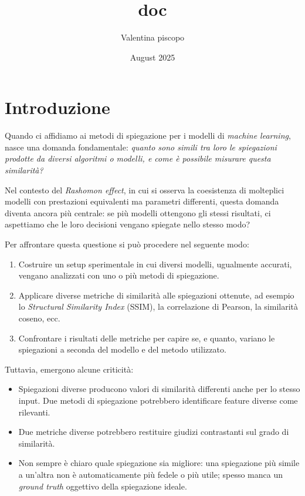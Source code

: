 \documentclass{article}
\title{doc}
\author{Valentina piscopo}
\date{August 2025}
\begin{document}
\maketitle

\tableofcontents
\newpage

\section{Introduzione}

Quando ci affidiamo ai metodi di spiegazione per i modelli di \emph{machine
      learning}, nasce una domanda fondamentale: \textit{quanto sono simili tra loro
      le spiegazioni prodotte da diversi algoritmi o modelli, e come è possibile
      misurare questa similarità?}

Nel contesto del \emph{Rashomon effect}, in cui si osserva la coesistenza di
molteplici modelli con prestazioni equivalenti ma parametri differenti, questa
domanda diventa ancora più centrale: se più modelli ottengono gli stessi
risultati, ci aspettiamo che le loro decisioni vengano spiegate nello stesso
modo?

Per affrontare questa questione si può procedere nel seguente modo:
\begin{enumerate}
      \item Costruire un setup sperimentale in cui diversi modelli, ugualmente accurati,
            vengano analizzati con uno o più metodi di spiegazione.
      \item Applicare diverse metriche di similarità alle spiegazioni ottenute, ad esempio
            lo \emph{Structural Similarity Index} (SSIM), la correlazione di Pearson, la
            similarità coseno, ecc.
      \item Confrontare i risultati delle metriche per capire se, e quanto, variano le
            spiegazioni a seconda del modello e del metodo utilizzato.
\end{enumerate}

Tuttavia, emergono alcune criticità:
\begin{itemize}
      \item Spiegazioni diverse producono valori di similarità differenti anche per lo
            stesso input. Due metodi di spiegazione potrebbero identificare feature diverse
            come rilevanti.
      \item Due metriche diverse potrebbero restituire giudizi contrastanti sul grado di
            similarità.
      \item Non sempre è chiaro quale spiegazione sia migliore: una spiegazione più simile
            a un’altra non è automaticamente più fedele o più utile; spesso manca un
            \emph{ground truth} oggettivo della spiegazione ideale.
\end{itemize}
\end{document}
